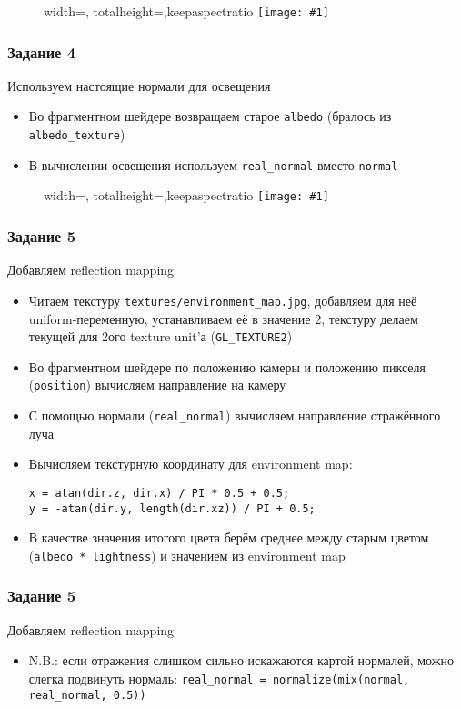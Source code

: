 \documentclass{beamer}
\newcommand{\slideimage}[1]{
  \begin{figure}
    \begin{adjustbox}{width=\textwidth, totalheight=\textheight-2\baselineskip-2\baselineskip,keepaspectratio}
      \texttt{[image: \#1]}
    \end{adjustbox}
  \end{figure}
}
\begin{document}
\begin{frame}[fragile]
\slideimage{3.png}
\end{frame}

\begin{frame}[fragile]
\frametitle{Задание 4}
Используем настоящие нормали для освещения
\begin{itemize}
\item Во фрагментном шейдере возвращаем старое \verb|albedo| (бралось из \verb|albedo_texture|)
\item В вычислении освещения используем \verb|real_normal| вместо \verb|normal|
\end{itemize}
\end{frame}

\begin{frame}[fragile]
\slideimage{4.png}
\end{frame}

\begin{frame}[fragile]
\frametitle{Задание 5}
Добавляем reflection mapping
\begin{itemize}
\item Читаем текстуру \verb|textures/environment_map.jpg|, добавляем для неё uniform-переменную, устанавливаем её в значение 2, текстуру делаем текущей для 2ого texture unit'а (\verb|GL_TEXTURE2|)
\item Во фрагментном шейдере по положению камеры и положению пикселя (\verb|position|) вычисляем направление на камеру
\item С помощью нормали (\verb|real_normal|) вычисляем направление отражённого луча
\item Вычисляем текстурную координату для environment map:
\begin{verbatim}
x = atan(dir.z, dir.x) / PI * 0.5 + 0.5;
y = -atan(dir.y, length(dir.xz)) / PI + 0.5;
\end{verbatim}
\item В качестве значения итогого цвета берём среднее между старым цветом (\verb|albedo * lightness|) и значением из environment map
\end{itemize}
\end{frame}

\begin{frame}[fragile]
\frametitle{Задание 5}
Добавляем reflection mapping
\begin{itemize}
\item N.B.: если отражения слишком сильно искажаются картой нормалей, можно слегка подвинуть нормаль: \verb|real_normal = normalize(mix(normal, real_normal, 0.5))|
\end{itemize}
\end{frame}
\end{document}
